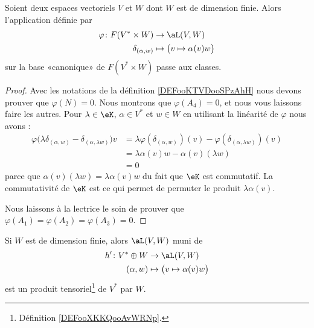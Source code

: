 \begin{lemma}       \label{LEMooOJEBooQruWEp}
    Soient deux espaces vectoriels \( V\) et \( W\) dont \( W\) est de dimension finie. Alors l'application définie par
    \begin{equation}
        \begin{aligned}
            \varphi\colon F(V^*\times W)&\to \aL(V,W) \\
            \delta_{(\alpha,w)}&\mapsto \big( v\mapsto \alpha(v)w \big) 
        \end{aligned}
    \end{equation}
    sur la base «canonique» de \( F(V^*\times W)\) passe aux classes.
\end{lemma}

\begin{proof}
    Avec les notations de la définition \ref{DEFooKTVDooSPzAhH} nous devons prouver que \( \varphi(N)=0\). Nous montrons que \( \varphi(A_4)=0\), et nous vous laissons faire les autres. Pour \( \lambda\in \eK\), \( \alpha\in V^*\) et \( w\in W\) en utilisant la linéarité de \( \varphi\) nous avons :
    \begin{subequations}
        \begin{align}
            \varphi\big( \lambda\delta_{(\alpha,w)}-\delta_{(\alpha,\lambda w)} \big)v&=\lambda\varphi(\delta_{(\alpha,w)})(v)-\varphi(\delta_{(\alpha,\lambda w)})(v)\\
            &=\lambda\alpha(v)w-\alpha(v)(\lambda w)\\
            &=0
        \end{align}
    \end{subequations}
    parce que \( \alpha(v)(\lambda w)=\lambda \alpha(v)w\) du fait que \( \eK\) est commutatif. La commutativité de \( \eK\) est ce qui permet de permuter le produit \( \lambda \alpha(v)\).

    Nous laissons à la lectrice le soin de prouver que \( \varphi(A_1)=\varphi(A_2)=\varphi(A_3)=0\).
\end{proof}

\begin{lemma}       \label{LEMooUQZHooWjIGsy}
    Si \( W\) est de dimension finie, alors \( \aL(V,W)\) muni de 
    \begin{equation}
        \begin{aligned}
            h'\colon V^*\oplus W&\to \aL(V,W) \\
            (\alpha,w)&\mapsto \big( v\mapsto \alpha(v)w \big) 
        \end{aligned}
    \end{equation}
    est un produit tensoriel\footnote{Définition \ref{DEFooXKKQooAvWRNp}.} de \( V^*\) par \( W\).
\end{lemma}

